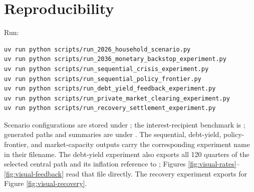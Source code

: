 \documentclass[11pt]{article}
\begin{document}
\section*{Reproducibility}

Run:
\begin{verbatim}
uv run python scripts/run_2026_household_scenario.py
uv run python scripts/run_2036_monetary_backstop_experiment.py
uv run python scripts/run_sequential_crisis_experiment.py
uv run python scripts/run_sequential_policy_frontier.py
uv run python scripts/run_debt_yield_feedback_experiment.py
uv run python scripts/run_private_market_clearing_experiment.py
uv run python scripts/run_recovery_settlement_experiment.py
\end{verbatim}

Scenario configurations are stored under ; the interest-recipient
benchmark is ; generated paths
and summaries are under .  The sequential, debt-yield, policy-frontier,
and market-capacity outputs carry the corresponding experiment name in their filename.  The
debt-yield experiment also exports all 120 quarters of the selected central path and its
inflation reference to ; Figures
\ref{fig:visual-rates}--\ref{fig:visual-feedback} read that file directly.  The recovery
experiment exports  for Figure
\ref{fig:visual-recovery}.
\end{document}
